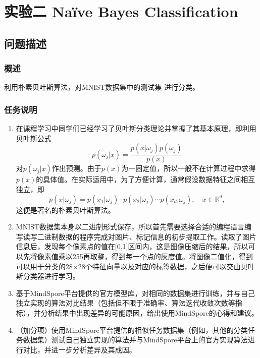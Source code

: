 \documentclass[12pt]{article}
\begin{document}
\newpage
\section{\centering 实验二 Na\"ive Bayes Classification}

\subsection{问题描述}
\subsubsection{概述}
利用朴素贝叶斯算法，对MNIST数据集中的测试集
进行分类。
\subsubsection{任务说明}

\begin{enumerate}
  \item 在课程学习中同学们已经学习了贝叶斯分类理论并掌握了其基本原理，即利用贝叶斯公式
        \[
          p(\omega_j|x) = \frac{p(x|\omega_j)p(\omega_j)}{p(x)}
        \]
        对\(p(\omega_j|x)\)作出预测。由于\(p(x)\)为一固定值，所以一般不在计算过程中求得\(p(x)\)的具体值。在实际运用中，为了方便计算，通常假设数据特征之间相互独立，即
        \[
          p(x|\omega_j) = p(x_1|\omega_j) \cdot p(x_2|\omega_j) \cdots p(x_d|\omega_j), \quad x \in \mathbb{R}^d,
        \]
        这便是著名的朴素贝叶斯算法。

  \item MNIST数据集本身以二进制形式保存，所以首先需要选择合适的编程语言编写读写二进制数据的程序完成对图片、标记信息的初步提取工作。读取了图片信息后，发现每个像素点的值在[0,1]区间内，这是图像压缩后的结果，所以可以先将像素值乘以255再取整，得到每一个点的灰度值。将图像二值化，得到可以用于分类的28×28个特征向量以及对应的标签数据，之后便可以交由贝叶斯分类器进行学习。

  \item 基于MindSpore平台提供的官方模型库，对相同的数据集进行训练，并与自己独立实现的算法对比结果（包括但不限于准确率、算法迭代收敛次数等指标），并分析结果中出现差异的可能原因，给出使用MindSpore的心得和建议。

  \item （加分项）使用MindSpore平台提供的相似任务数据集（例如，其他的分类任务数据集）测试自己独立实现的算法并与MindSpore平台上的官方实现算法进行对比，并进一步分析差异及其成因。
\end{enumerate}
\end{document}
